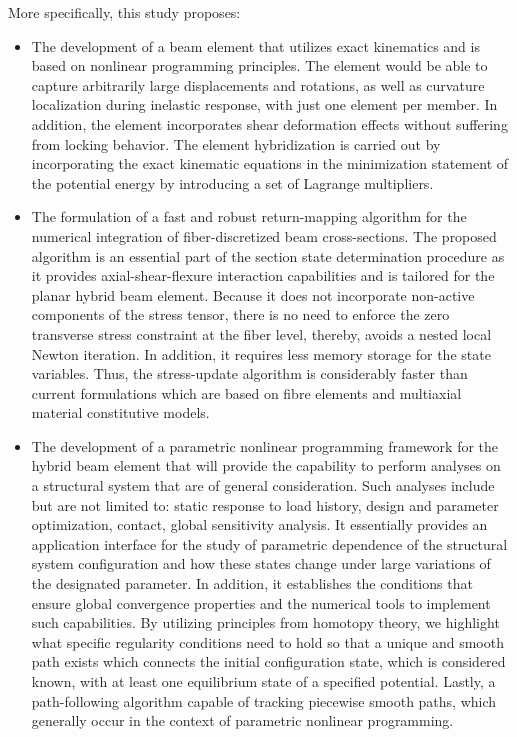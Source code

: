 More specifically, this study proposes:
\begin{itemize}
	\item The development of a beam element that utilizes exact kinematics and is 
	based on nonlinear programming principles. The element would be able to 
	capture 
	arbitrarily large displacements and rotations, as well as curvature localization 
	during inelastic response, with just one element per member. In addition, 
	the element
	incorporates shear deformation effects without suffering from locking 
	behavior. The element hybridization is carried out by incorporating the 
	exact kinematic equations in the minimization statement of the potential 
	energy by introducing a set of Lagrange multipliers.
	
	\item The formulation of a fast and robust return-mapping algorithm for the 
	numerical integration of fiber-discretized beam cross-sections. The proposed 
	algorithm is an essential part of the section state determination procedure as it 
	provides axial-shear-flexure interaction capabilities and is tailored for the 
	planar hybrid beam element. Because it does not incorporate non-active components 
	of the stress tensor, there is no need to enforce the zero transverse stress 
	constraint at the fiber level, thereby, avoids a nested local Newton iteration. In 
	addition, it requires less memory storage for the state variables. Thus, 
	the stress-update algorithm is considerably faster than current 
	formulations which are based on fibre elements and multiaxial material 
	constitutive models.
	
	\item The development of a parametric nonlinear programming framework for 
	the hybrid beam 
	element that will provide the capability to perform analyses on a structural 
	system that are of general consideration. Such analyses include but are not 
	limited to: static response to load history, design and parameter optimization, 
	contact, global sensitivity analysis. It essentially provides an application 
	interface for the study of parametric dependence of the structural system 
	configuration and how these states change under large variations of the designated 
	parameter. In addition, it establishes the conditions that ensure global 
	convergence properties and the numerical tools to implement such capabilities. By 
	utilizing principles from homotopy theory, we highlight what specific
	regularity conditions need to hold so that a unique and smooth path exists which
	connects the initial configuration state, which is considered known, with at least 
	one equilibrium state of a specified potential. Lastly, a path-following 
	algorithm capable of tracking piecewise smooth paths, which generally occur 
	in the context of parametric nonlinear programming.
	

\end{itemize}
